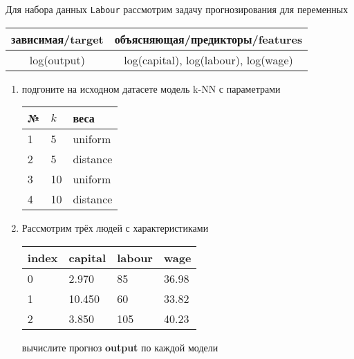\begin{exercise}
Для набора данных \texttt{Labour} рассмотрим задачу прогнозирования
для переменных
\begin{center}
	\begin{tabular}{|c|c|}\hline
		зависимая/target & объясняющая/предикторы/features \\ \hline
		log(output) & log(capital), log(labour), log(wage) \\ \hline
	\end{tabular}
\end{center}
\begin{enumerate}
	\item подгоните на исходном датасете модель k-NN с параметрами
	\begin{center}
		\begin{tabular}{|l|l|l|}\hline
		№ & \(k\) & веса \\ \hline
		1 & 5 & uniform \\
		2 & 5 & distance \\
		3 & 10 & uniform \\
		4 & 10 & distance \\ \hline
		\end{tabular}
	\end{center}
	\item Рассмотрим трёх людей с характеристиками
	\begin{center}
		\begin{tabular}{|l||l|l|l|}\hline
			index & capital & labour & wage \\ \hline\hline
			0 & 2.970 & 85 & 36.98\\
			1 & 10.450 & 60 & 33.82  \\
			2 & 3.850 & 105 & 40.23\\ \hline
		\end{tabular}
	\end{center}
	вычислите прогноз \textbf{output} по каждой модели
\end{enumerate}
\end{exercise}